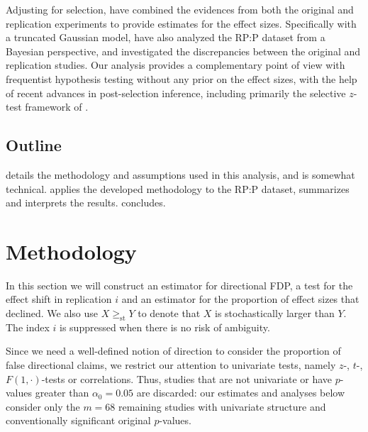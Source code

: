 \documentclass[11pt]{article}
\theoremstyle{definition}
\theoremstyle{custom}
\newcommand{\ao}{\alpha_0}
\newcommand{\gest}{\ge_\text{st}}
\begin{document}
  Adjusting for selection, \citet{vanAert:2017,vanAert:2018} have combined the evidences from both the original and replication experiments to provide estimates for the effect sizes. Specifically with a truncated Gaussian model, \citet{Etz:2016gx} have also analyzed the RP:P dataset from a Bayesian perspective, and investigated the discrepancies between the original and replication studies. Our analysis provides a complementary point of view with frequentist hypothesis testing without any prior on the effect sizes, with the help of recent advances in post-selection inference, including primarily the selective $z$-test framework of \citet{Lee:2016fv}.

\subsection{Outline}

   details the methodology and assumptions used in this analysis, and is somewhat technical.  applies the developed methodology to the RP:P dataset, summarizes and interprets the results.  concludes.

\section{Methodology}
\label{sec:methodology}

  In this section we will construct an estimator for directional FDP, a test for the effect shift in replication $i$ and an estimator for the proportion of effect sizes that declined. We also use $X \gest Y$ to denote that $X$ is stochastically larger than $Y$. The index $i$ is suppressed when there is no risk of ambiguity. 

  Since we need a well-defined notion of direction to consider the proportion of false directional claims, we restrict our attention to univariate tests, namely $z$-, $t$-, $F(1, \cdot)$-tests or correlations. Thus, studies that are not univariate or have $p$-values greater than $\ao = 0.05$ are discarded: our estimates and analyses below consider only the $m = 68$ remaining studies with univariate structure and conventionally significant original $p$-values.
\end{document}
